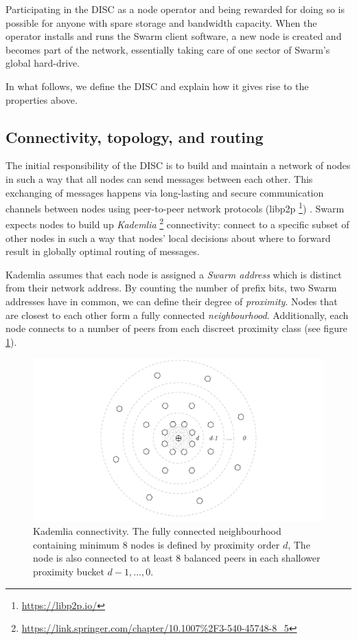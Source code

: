 \documentclass[12pt,a4paper]{article}
\begin{document}
Participating in the DISC as a node operator and being rewarded for doing so is possible for anyone with spare storage and bandwidth capacity. When the operator installs and runs the Swarm client software, a new node is created and becomes part of the network, essentially taking care of one sector of Swarm's global hard-drive.

In what follows, we define the DISC and explain how it gives rise to the properties above.

\subsection{Connectivity, topology, and routing}

The initial responsibility of the DISC is to build and maintain a network of nodes in such a way that all nodes can send messages between each other. This exchanging of messages happens via long-lasting and secure communication channels between nodes using peer-to-peer network protocols (libp2p%
\footnote{\url{https://libp2p.io/}}) 
. Swarm expects nodes to build up \emph{Kademlia}%
\footnote{\url{https://link.springer.com/chapter/10.1007\%2F3-540-45748-8_5}} connectivity:
connect to a specific subset of other nodes in such a way that nodes' local decisions about where  to forward result in globally optimal routing of messages.%


Kademlia assumes that each node is assigned a \emph{Swarm address} which is distinct from their network address. By counting the number of prefix bits, two Swarm addresses have in common, we can define their degree of \emph{proximity}. Nodes that are closest to each other form a fully connected \emph{neighbourhood}. Additionally, each node connects to a number of peers from each discreet proximity class (see figure \ref{fig:swarm-kademlia}).


\begin{figure}[!ht]
   \centering
   \includegraphics[width=\textwidth]{fig2/swarm-kademlia.pdf}
   \caption[Kademlia connectivity]{Kademlia connectivity. The fully connected neighbourhood containing minimum 8 nodes is defined by proximity order $d$, The node is also connected to  at least 8 balanced peers in each shallower proximity bucket $d-1, \ldots, 0$. }
   \label{fig:swarm-kademlia}
\end{figure}
\end{document}
